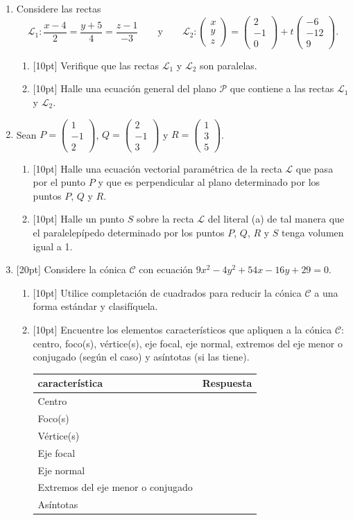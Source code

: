 \documentclass[11pt]{article}
\newcommand{\vectiii}[3]{\begin{pmatrix}#1\\#2\\#3\end{pmatrix}}
\begin{document}
\begin{enumerate}
\item Considere las rectas
$$\mathcal{L}_1:\frac{x-4}{2}=\frac{y+5}{4}=\frac{z-1}{-3}\qquad\text{y}\qquad \mathcal{L}_2:\vectiii{x}{y}{z}=\vectiii{2}{-1}{0}+t\vectiii{-6}{-12}{9}.$$

\begin{enumerate}[label=(\alph*)]
\item{}[10pt] Verifique que las rectas $\mathcal{L}_1$ y $\mathcal{L}_2$ son paralelas.
\item{}[10pt] Halle una ecuación general del plano $\mathcal{P}$ que contiene a las rectas $\mathcal{L}_1$ y $\mathcal{L}_2$.
\end{enumerate}

\item Sean $P=\vectiii{1}{-1}{2}$, $Q=\vectiii{2}{-1}{3}$ y $R=\vectiii{1}{3}{5}$.

\begin{enumerate}[label=(\alph*)]
\item{}[10pt] Halle una ecuación vectorial paramétrica de la recta $\mathcal{L}$ que pasa por el punto $P$ y que es perpendicular al plano determinado por los puntos $P$, $Q$ y $R$.
\item{}[10pt] Halle un punto $S$ sobre la recta $\mathcal{L}$ del literal (a) de tal manera que el paralelepípedo determinado por los puntos $P$, $Q$, $R$ y $S$ tenga volumen igual a 1.
\end{enumerate}

\item{}[20pt] Considere la cónica $\mathcal{C}$ con ecuación $9x^2-4y^2+54x-16y+29=0$.

\begin{enumerate}[label=(\alph*)]
\item{}[10pt] Utilice completación de cuadrados para reducir la cónica $\mathcal{C}$ a una forma estándar y clasifíquela.
\item{}[10pt] Encuentre los elementos característicos que apliquen a la cónica $\mathcal{C}$: centro, foco(s), vértice(s), eje focal, eje normal, extremos del eje menor o conjugado (según el caso) y asíntotas (si las tiene).

\begin{center}
\begin{tabular}{|l|l|}
\hline
\textbf{característica} & \textbf{Respuesta} \\
\hline
Centro & \\
\hline
Foco(s) & \\
\hline
Vértice(s) & \\
\hline
Eje focal & \\
\hline
Eje normal & \\
\hline
Extremos del eje menor o conjugado & \\
\hline
Asíntotas & \\
\hline
\end{tabular}
\end{center}
\end{enumerate}
\end{enumerate}
\end{document}
